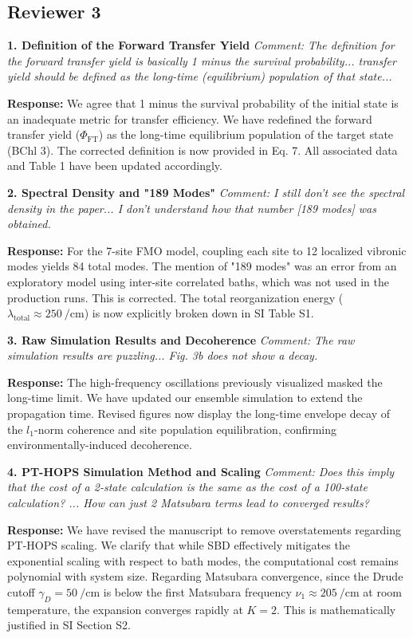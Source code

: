 \documentclass[11pt]{article}
\begin{document}
\subsection*{Reviewer 3}

\textbf{1. Definition of the Forward Transfer Yield}
\textit{Comment: The definition for the forward transfer yield is basically 1 minus the survival probability... transfer yield should be defined as the long-time (equilibrium) population of that state...}

\textbf{Response:} We agree that 1 minus the survival probability of the initial state is an inadequate metric for transfer efficiency. We have redefined the forward transfer yield ($\Phi_{\mathrm{FT}}$) as the long-time equilibrium population of the target state (BChl 3). The corrected definition is now provided in Eq. 7. All associated data and Table 1 have been updated accordingly.

\textbf{2. Spectral Density and "189 Modes"}
\textit{Comment: I still don’t see the spectral density in the paper... I don’t understand how that number [189 modes] was obtained.}

\textbf{Response:} For the 7-site FMO model, coupling each site to 12 localized vibronic modes yields 84 total modes. The mention of "189 modes" was an error from an exploratory model using inter-site correlated baths, which was not used in the production runs. This is corrected. The total reorganization energy ($\lambda_{\mathrm{total}} \approx \SI{250}{\per\centi\meter}$) is now explicitly broken down in SI Table S1.

\textbf{3. Raw Simulation Results and Decoherence}
\textit{Comment: The raw simulation results are puzzling... Fig. 3b does not show a decay.}

\textbf{Response:} The high-frequency oscillations previously visualized masked the long-time limit. We have updated our ensemble simulation to extend the propagation time. Revised figures now display the long-time envelope decay of the $l_1$-norm coherence and site population equilibration, confirming environmentally-induced decoherence.

\textbf{4. PT-HOPS Simulation Method and Scaling}
\textit{Comment: Does this imply that the cost of a 2-state calculation is the same as the cost of a 100-state calculation? ... How can just 2 Matsubara terms lead to converged results?}

\textbf{Response:} We have revised the manuscript to remove overstatements regarding PT-HOPS scaling. We clarify that while SBD effectively mitigates the exponential scaling with respect to bath modes, the computational cost remains polynomial with system size. Regarding Matsubara convergence, since the Drude cutoff $\gamma_D = \SI{50}{\per\centi\meter}$ is below the first Matsubara frequency $\nu_1 \approx \SI{205}{\per\centi\meter}$ at room temperature, the expansion converges rapidly at $K=2$. This is mathematically justified in SI Section S2.
\end{document}
